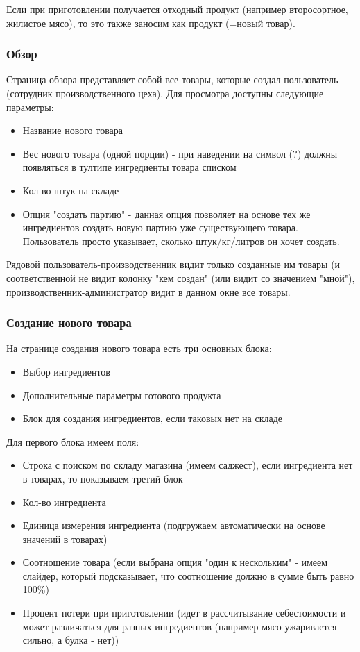\documentclass[DIV=calc, paper=a4, fontsize=11pt]{scrartcl} %
\begin{document}
Если при приготовлении получается отходный продукт (например второсортное, жилистое мясо), то это также заносим как продукт (=новый товар).

\subsubsection{Обзор}
Страница обзора представляет собой все товары, которые создал пользователь (сотрудник производственного цеха). Для просмотра доступны следующие параметры:

\begin{itemize}
	\item Название нового товара
	\item Вес нового товара (одной порции) - при наведении на символ (?) должны появляться в тултипе ингредиенты товара списком
	\item Кол-во штук на складе 
	\item Опция "создать партию" - данная опция позволяет на основе тех же ингредиентов создать новую партию уже существующего товара. Пользователь просто указывает, сколько штук/кг/литров он хочет создать.
\end{itemize}

Рядовой пользователь-производственник видит только созданные им товары (и соответственной не видит колонку "кем создан" (или видит со значением "мной"), производственник-администратор видит в данном окне все товары.

\subsubsection{Создание нового товара}

На странице создания нового товара есть три основных блока:
\begin{itemize}
	\item Выбор ингредиентов
	\item Дополнительные параметры готового продукта
	\item Блок для создания ингредиентов, если таковых нет на складе
\end{itemize}

Для первого блока имеем поля:

\begin{itemize}
	\item Строка с поиском по складу магазина (имеем саджест), если ингредиента нет в товарах, то показываем третий блок
	\item Кол-во ингредиента
	\item Единица измерения ингредиента (подгружаем автоматически на основе значений в товарах)
	\item Соотношение товара (если выбрана опция "один к нескольким" - имеем слайдер, который подсказывает, что соотношение должно в сумме быть равно 100\%)
	\item Процент потери при приготовлении (идет в рассчитывание себестоимости и может различаться для разных ингредиентов (например мясо ужаривается сильно, а булка - нет))
\end{itemize}
\end{document}
